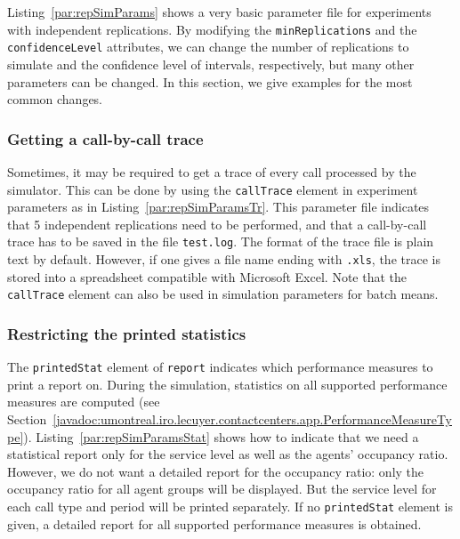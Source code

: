 Listing~\ref{par:repSimParams} shows a very basic parameter file for
experiments with independent replications. By modifying
the \texttt{minReplications} and the \texttt{confidenceLevel}
attributes, we can change the number of replications to simulate and
the confidence level of intervals, respectively, but many other
parameters can be changed.  In this section, we give examples for the
most common changes.

\subsubsection{Getting a call-by-call trace}
\label{sec:trace}

Sometimes, it may be required to get a trace of every call processed
by the simulator.
This can be done by using the \texttt{call\-Trace} element in
experiment parameters as in Listing~\ref{par:repSimParamsTr}.
This parameter file indicates that 5 independent replications need to
be performed, and that a call-by-call trace has to be saved in the file
\texttt{test.log}.
The format of the trace file is plain text by default.
However, if one gives a file name ending with \texttt{.xls}, the trace
is stored into a spreadsheet compatible with Microsoft Excel.
Note that the \texttt{call\-Trace} element can also be used in
simulation parameters for batch means.




\subsubsection{Restricting the printed statistics}

The \texttt{printed\-Stat} element %
of \texttt{report}
indicates which performance measures
to print a report on.  During the simulation, statistics on all
supported performance measures are computed (see
Section~\ref{javadoc:umontreal.iro.lecuyer.contactcenters.app.PerformanceMeasureType}).
Listing~\ref{par:repSimParamsStat}
shows how to
indicate that we need a statistical report only for the
service level as well as the agents' occupancy ratio.  However, we do
not want a detailed report for the occupancy ratio: only the occupancy
ratio for all agent groups will be displayed.  But the
service level for each call type and period will be printed separately.
If no \texttt{printed\-Stat} element is given, a detailed report
for all supported performance measures is obtained.

